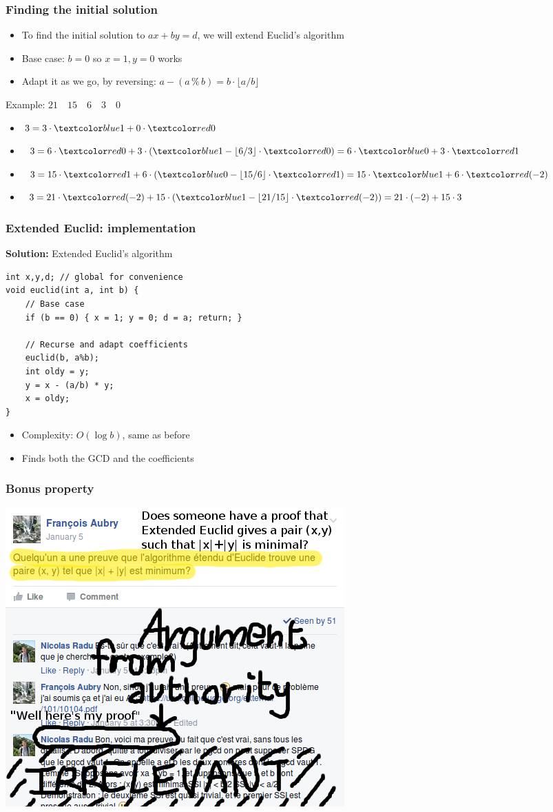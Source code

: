 \documentclass[12pt]{beamer}
\begin{document}
\begin{frame}
\frametitle{Finding the initial solution}
\begin{itemize}
\item To find the initial solution to $ax+by=d$, we will extend Euclid's algorithm
\item Base case: $b=0$ so $x=1, y=0$ works
\item Adapt it as we go, by reversing: $a - (a\,\%\,b) = b \cdot \lfloor{a/b}\rfloor$
\end{itemize}

Example: $21 \quad 15 \quad 6 \quad 3 \quad 0$
\begin{itemize}
\item $3= 3\cdot\blue{1}+0\cdot\red{0}$
\item $3= 6\cdot\red{0}+3\cdot(\blue{1}-\lfloor6/3\rfloor\cdot\red{0}) = 6\cdot\blue{0}+3\cdot\red{1}$
\item $3= 15\cdot\red{1}+6\cdot(\blue{0}-\lfloor15/6\rfloor\cdot\red{1}) = 15\cdot\blue{1}+6\cdot\red{(-2)}$
\item $3= 21\cdot\red{(-2)}+15\cdot(\blue{1}-\lfloor21/15\rfloor\cdot\red{(-2)}) = 21\cdot(-2) + 15\cdot3$
\end{itemize}
\end{frame}

\begin{frame}[fragile]
\frametitle{Extended Euclid: implementation}
\textbf{Solution:} Extended Euclid's algorithm
\begin{lstlisting}
int x,y,d; // global for convenience
void euclid(int a, int b) {
    // Base case
    if (b == 0) { x = 1; y = 0; d = a; return; }
    
    // Recurse and adapt coefficients
    euclid(b, a%b);
    int oldy = y;
    y = x - (a/b) * y;
    x = oldy;
}
\end{lstlisting}
\begin{itemize}
\item Complexity: $O(\log b)$, same as before
\item Finds both the GCD and the coefficients
\end{itemize}
\end{frame}

\begin{frame}
\frametitle{Bonus property}
\begin{center}
\includegraphics[width=.8\textwidth]{img/authority}
\end{center}
\end{frame}
\end{document}
